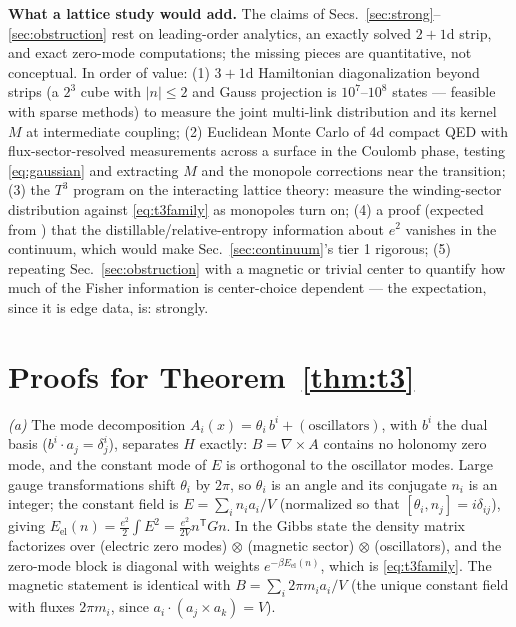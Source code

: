 \documentclass[11pt]{article}
\theoremstyle{remark}
\theoremstyle{plain}
\begin{document}
\textbf{What a lattice study would add.} The claims of Secs.~\ref{sec:strong}--\ref{sec:obstruction} rest on leading-order analytics, an exactly solved $2{+}1$d strip, and exact zero-mode computations; the missing pieces are quantitative, not conceptual. In order of value: (1) $3{+}1$d Hamiltonian diagonalization beyond strips (a $2^3$ cube with $|n| \leq 2$ and Gauss projection is $10^7$--$10^8$ states --- feasible with sparse methods) to measure the joint multi-link distribution and its kernel $M$ at intermediate coupling; (2) Euclidean Monte Carlo of 4d compact QED with flux-sector-resolved measurements across a surface in the Coulomb phase, testing \eqref{eq:gaussian} and extracting $M$ and the monopole corrections near the transition; (3) the $T^3$ program on the interacting lattice theory: measure the winding-sector distribution against \eqref{eq:t3family} as monopoles turn on; (4) a proof (expected from \cite{MST18, CHMP}) that the distillable/relative-entropy information about $e^2$ vanishes in the continuum, which would make Sec.~\ref{sec:continuum}'s tier 1 rigorous; (5) repeating Sec.~\ref{sec:obstruction} with a magnetic or trivial center to quantify how much of the Fisher information is center-choice dependent --- the expectation, since it is edge data, is: strongly.

\appendix

\section{Proofs for Theorem~\texorpdfstring{\ref{thm:t3}}{1}}\label{app:proofs}

\emph{(a)} The mode decomposition $A_i(x) = \theta_i\, b^i + (\text{oscillators})$, with $b^i$ the dual basis ($b^i \cdot a_j = \delta^i_j$), separates $H$ exactly: $B = \nabla \times A$ contains no holonomy zero mode, and the constant mode of $E$ is orthogonal to the oscillator modes. Large gauge transformations shift $\theta_i$ by $2\pi$, so $\theta_i$ is an angle and its conjugate $n_i$ is an integer; the constant field is $E = \sum_i n_i a_i / V$ (normalized so that $[\theta_i, n_j] = i\delta_{ij}$), giving $E_{\mathrm{el}}(n) = \frac{e^2}{2}\int E^2 = \frac{e^2}{2V} n^{\mathsf T} G n$. In the Gibbs state the density matrix factorizes over (electric zero modes) $\otimes$ (magnetic sector) $\otimes$ (oscillators), and the zero-mode block is diagonal with weights $e^{-\beta E_{\mathrm{el}}(n)}$, which is \eqref{eq:t3family}. The magnetic statement is identical with $B = \sum_i 2\pi m_i a_i / V$ (the unique constant field with fluxes $2\pi m_i$, since $a_i \cdot (a_j \times a_k) = V$).
\end{document}

